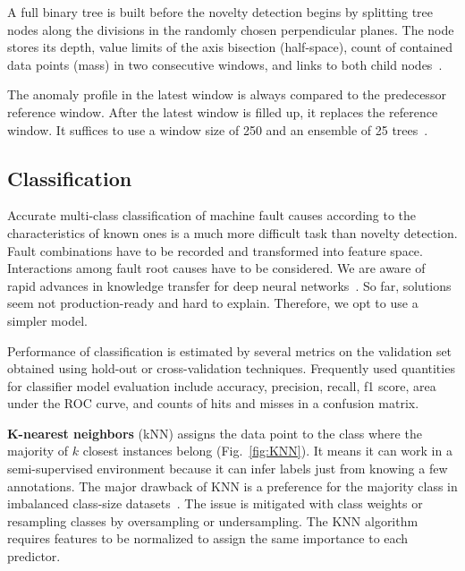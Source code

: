 A full binary tree is built before the novelty detection begins by splitting tree nodes along the divisions in the randomly chosen perpendicular planes. The node stores its depth, value limits of the axis bisection (half-space), count of contained data points (mass) in two consecutive windows, and links to both child nodes~\cite{tan_fast_2011}. 

The anomaly profile in the latest window is always compared to the predecessor reference window. After the latest window is filled up, it replaces the reference window. It suffices to use a window size of 250 and an ensemble of 25 trees~\cite{tan_fast_2011}.

\subsection{Classification}
Accurate multi-class classification of machine fault causes according to the characteristics of known ones is a much more difficult task than novelty detection. Fault combinations have to be recorded and transformed into feature space. Interactions among fault root causes have to be considered. We are aware of rapid advances in knowledge transfer for deep neural networks~\cite{maurya_condition-based_2021}. So far, solutions seem not production-ready and hard to explain. Therefore, we opt to use a simpler model.

Performance of classification is estimated by several metrics on the validation set obtained using hold-out or cross-validation techniques. Frequently used quantities for classifier model evaluation include accuracy, precision, recall, f1 score, area under the ROC curve, and counts of hits and misses in a confusion matrix.
\bigbreak

\textbf{K-nearest neighbors} (kNN) assigns the data point to the class where the majority of $k$ closest instances belong (Fig.~\ref{fig:KNN}). It means it can work in a semi-supervised environment because it can infer labels just from knowing a few annotations. The major drawback of KNN is a preference for the majority class in imbalanced class-size datasets~\cite{shi_improving_2020}. The issue is mitigated with class weights or resampling classes by oversampling or undersampling. The KNN algorithm requires features to be normalized to assign the same importance to each predictor.

